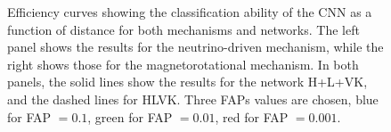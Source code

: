 \documentclass[aps,twocolumn,showpacs,groupedaddress, nofootinbib]{revtex4}  %
\begin{document}
%
%
\begin{figure}
     \begin{center}
        \quad
    \end{center}
    \caption{Efficiency curves showing the classification ability of the
\ac{CNN} as a function of distance for both mechanisms and networks.  The left
panel shows the results for the neutrino-driven mechanism, while the right
shows those for the magnetorotational mechanism. In both panels, the solid
lines show the results for the network H+L+VK, and the dashed lines for HLVK.
Three \acp{FAP} values are chosen, blue for \ac{FAP} $=0.1$, green for \ac{FAP}
$=0.01$, red for \ac{FAP} $=0.001$.\label{fig:eff}}
\end{figure}
\end{document}
